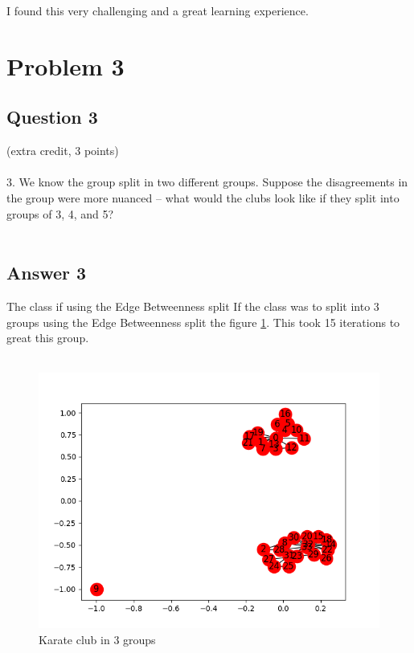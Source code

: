 \documentclass[10pt,letterpaper]{article}
\begin{document}
I found this very challenging and a great learning experience.


\pagebreak
\section{Problem 3}
\subsection{Question 3}
(extra credit, 3 points)\\
\\
3.  We know the group split in two different groups.  Suppose the
disagreements in the group were more nuanced -- what would the clubs
look like if they split into groups of 3, 4, and 5?\\
\\
\subsection{Answer 3}

The class if using the Edge Betweenness split
If the class was to split into 3 groups using the Edge Betweenness split the figure \ref{fig:kart4}.  This took 15 iterations to great this group.\\
\\
\begin{figure}[h!]
  \includegraphics[width=\linewidth]{karate15.png}
  \caption{ Karate club in 3 groups}
  \label{fig:kart4}
\end{figure}
\end{document}
